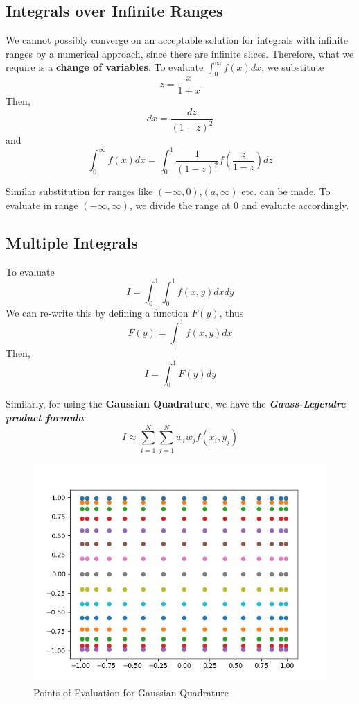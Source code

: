\subsection{Integrals over Infinite Ranges}
We cannot possibly converge on an acceptable solution for integrals with infinite ranges by a numerical approach, since there are infinite slices. Therefore, what we require is a \textbf{change of variables}. To evaluate $\int_{0}^{\infty}f(x)dx$, we substitute $$z=\dfrac{x}{1+x}$$ Then, $$dx=\dfrac{dz}{(1-z)^{2}}$$ and $$\int_{0}^{\infty}f(x)dx=\int_{0}^{1}\dfrac{1}{(1-z)^{2}}f\left(\dfrac{z}{1-z}\right)dz$$
\par Similar substitution for ranges like $(-\infty,0)$,$(a,\infty)$ etc. can be made. To evaluate in range $(-\infty,\infty)$, we divide the range at 0 and evaluate accordingly.

\subsection{Multiple Integrals}
To evaluate $$I= \int_{0}^{1}\int_{0}^{1}f(x,y)dx dy$$ We can re-write this by defining a function $F(y)$, thus $$F(y)=\int_{0}^{1}f(x,y)dx$$ Then, $$I=\int_{0}^{1}F(y)dy$$
\par Similarly, for using the \textbf{Gaussian Quadrature}, we have the \textbf{\textit{Gauss-Legendre product formula}}:
$$I\approx\sum_{i=1}^{N}\sum_{j=1}^{N}w_{i}w_{j}f(x_{i},y_{j})$$
\begin{figure}[H]
	\centering
	\includegraphics[width=0.7\linewidth]{multiplepoints}
	\caption{Points of Evaluation for Gaussian Quadrature}
	\label{fig:multiplepoints}
\end{figure}










